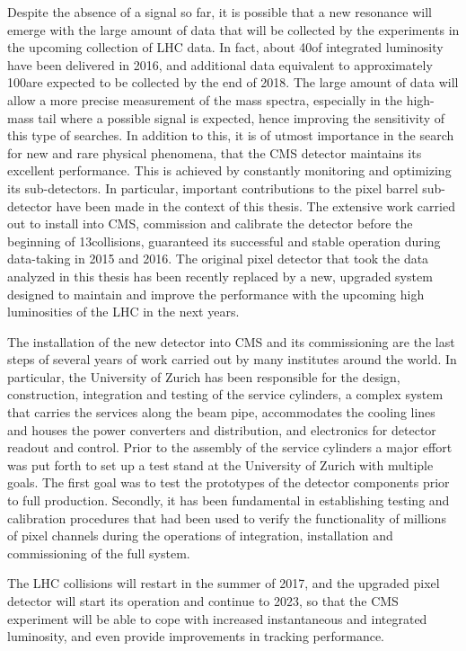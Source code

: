 Despite the absence of a signal so far, it is possible that a new resonance will emerge with the large amount of data that will be collected by the experiments in the upcoming collection of LHC data.
In fact, about 40\fbinv of integrated luminosity have been delivered in 2016, and additional data equivalent to approximately 100\fbinv are expected to be collected by the end of 2018.
The large amount of data will allow a more precise measurement of the mass spectra, especially in the high-mass tail where a possible signal is expected, hence improving the sensitivity of this type of searches.
In addition to this, it is of utmost importance in the search for new and rare physical phenomena, that the CMS detector maintains its excellent performance.
This is achieved by constantly monitoring and optimizing its sub-detectors. In particular, important contributions to the pixel barrel sub-detector have been made in the context of this thesis.
The extensive work carried out to install into CMS, commission and calibrate the detector before the beginning of 13\TeV collisions, guaranteed its successful and stable operation during data-taking in 2015 and 2016.
The original pixel detector that took the data analyzed in this thesis has been recently replaced by a new, upgraded system designed to maintain and improve the performance with the upcoming high luminosities of the LHC in the next years.

The installation of the new detector into CMS and its commissioning are the last steps of several years of work carried out by many institutes around the world. In particular, the University of Zurich has been responsible for the design, construction, integration and testing of the service cylinders, a complex system that carries the services along the beam pipe, accommodates the cooling lines and houses the power converters and distribution, and electronics for detector readout and control.
Prior to the assembly of the service cylinders a major effort was put forth to set up a test stand at the University of Zurich with multiple goals. The first goal was to test the prototypes of the detector components prior to full production. Secondly, it has been fundamental in establishing testing and calibration procedures that had been used to verify the functionality of millions of pixel channels during the operations of integration, installation and commissioning of the full system.

The LHC collisions will restart in the summer of 2017, and the upgraded pixel detector will start its operation and continue to 2023, so that the CMS experiment will be able to cope with increased instantaneous and integrated luminosity, and even provide improvements in tracking performance.